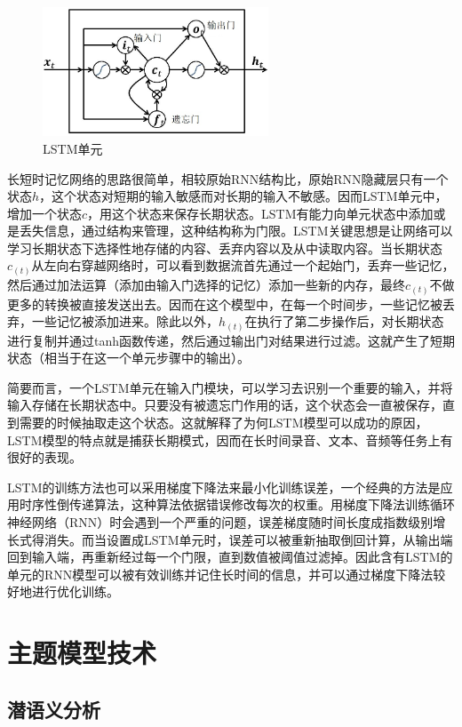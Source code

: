 \documentclass[winfonts,master,oneside,nobackinfo]{njuthesis}
\begin{document}
\begin{figure}[h]
\centering
\includegraphics[width=0.6\textwidth]{./figure/LSTM.jpg}
\caption{LSTM单元}
\label{lstm}
\end{figure}

长短时记忆网络的思路很简单，相较原始RNN结构比，原始RNN隐藏层只有一个状态$h$，这个状态对短期的输入敏感而对长期的输入不敏感。因而LSTM单元中，增加一个状态$c$，用这个状态来保存长期状态。LSTM有能力向单元状态中添加或是丢失信息，通过结构来管理，这种结构称为门限。LSTM关键思想是让网络可以学习长期状态下选择性地存储的内容、丢弃内容以及从中读取内容。当长期状态${ c } _ { ( t ) }$从左向右穿越网络时，可以看到数据流首先通过一个起始门，丢弃一些记忆，然后通过加法运算（添加由输入门选择的记忆）添加一些新的内存，最终${ c } _ { ( t ) }$不做更多的转换被直接发送出去。因而在这个模型中，在每一个时间步，一些记忆被丢弃，一些记忆被添加进来。除此以外，${ h } _ { ( t ) }$在执行了第二步操作后，对长期状态进行复制并通过tanh函数传递，然后通过输出门对结果进行过滤。这就产生了短期状态（相当于在这一个单元步骤中的输出）。

简要而言，一个LSTM单元在输入门模块，可以学习去识别一个重要的输入，并将输入存储在长期状态中。只要没有被遗忘门作用的话，这个状态会一直被保存，直到需要的时候抽取走这个状态。这就解释了为何LSTM模型可以成功的原因，LSTM模型的特点就是捕获长期模式，因而在长时间录音、文本、音频等任务上有很好的表现。

LSTM的训练方法也可以采用梯度下降法来最小化训练误差，一个经典的方法是应用时序性倒传递算法，这种算法依据错误修改每次的权重。用梯度下降法训练循环神经网络（RNN）时会遇到一个严重的问题，误差梯度随时间长度成指数级别增长式得消失。而当设置成LSTM单元时，误差可以被重新抽取倒回计算，从输出端回到输入端，再重新经过每一个门限，直到数值被阈值过滤掉。因此含有LSTM的单元的RNN模型可以被有效训练并记住长时间的信息，并可以通过梯度下降法较好地进行优化训练。

\section{主题模型技术}

\subsection{潜语义分析}
\end{document}
